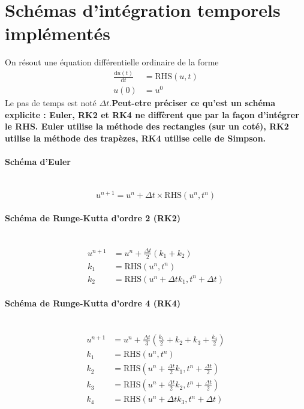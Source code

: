 \section{Schémas d'intégration temporels implémentés}
\label{section:Schemas_temporels}
On résout une équation différentielle ordinaire de la forme
\begin{align}
	\frac{\mathrm{d}u(t)}{\mathrm{d}t} &= \mathrm{RHS}(u, t)\\
	u(0) &= u^0
\end{align}
Le pas de temps est noté $\Delta t$.\textbf{Peut-etre préciser ce qu'est un schéma explicite : Euler, RK2 et RK4 ne diffèrent que par la façon d'intégrer le RHS. Euler utilise la méthode des rectangles (sur un coté), RK2 utilise la méthode des trapèzes, RK4 utilise celle de Simpson.}
\paragraph{Schéma d'Euler}~\\
\begin{equation}
	u^{n+1} = u^n+\Delta t\times \mathrm{RHS}(u^n, t^n)
\end{equation}
\paragraph{Schéma de Runge-Kutta d'ordre 2 (RK2)}~\\
\begin{align}
	u^{n+1} &= u^n+\frac{\Delta t}{2}(k_1+k_2)\\
	k_1 &= \mathrm{RHS}(u^n, t^n)\\
	k_2 &= \mathrm{RHS}(u^n +\Delta t k_1, t^n+\Delta t)
\end{align}
\paragraph{Schéma de Runge-Kutta d'ordre 4 (RK4)}~\\
\begin{align}
	u^{n+1} &= u^n+\frac{\Delta t}{3}(\frac{k_1}{2}+k_2+k_3+\frac{k_4}{2})\\
	k_1 &= \mathrm{RHS}(u^n, t^n)\\
	k_2 &= \mathrm{RHS}(u^n +\frac{\Delta t}{2}k_1, t^n+\frac{\Delta t}{2})\\
	k_3 &= \mathrm{RHS}(u^n+\frac{\Delta t}{2}k_2, t^n+\frac{\Delta t}{2})\\
	k_4 &= \mathrm{RHS}(u^n+\Delta t k_3, t^n+\Delta t)
\end{align}


